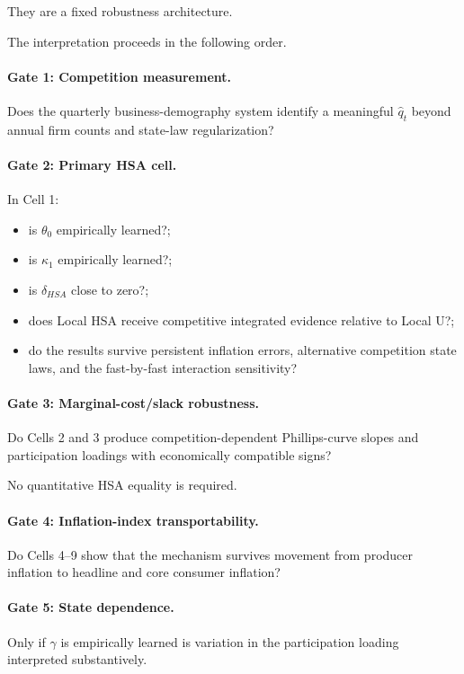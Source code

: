 \documentclass[11pt]{article}
\begin{document}
They are a fixed robustness architecture.

The interpretation proceeds in the following order.

\paragraph{Gate 1: Competition measurement.}
Does the quarterly business-demography system identify a meaningful \(\hat q_t\) beyond annual firm counts and state-law regularization?

\paragraph{Gate 2: Primary HSA cell.}
In Cell 1:
\begin{itemize}
\item is \(\theta_0\) empirically learned?;
\item is \(\kappa_1\) empirically learned?;
\item is \(\delta_{HSA}\) close to zero?;
\item does Local HSA receive competitive integrated evidence relative to Local U?;
\item do the results survive persistent inflation errors, alternative competition state laws, and the fast-by-fast interaction sensitivity?
\end{itemize}

\paragraph{Gate 3: Marginal-cost/slack robustness.}
Do Cells 2 and 3 produce competition-dependent Phillips-curve slopes and participation loadings with economically compatible signs?

No quantitative HSA equality is required.

\paragraph{Gate 4: Inflation-index transportability.}
Do Cells 4--9 show that the mechanism survives movement from producer inflation to headline and core consumer inflation?

\paragraph{Gate 5: State dependence.}
Only if \(\gamma\) is empirically learned is variation in the participation loading interpreted substantively.
\end{document}
